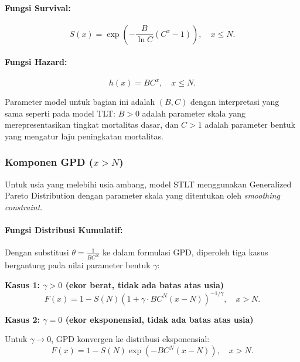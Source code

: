 \paragraph{Fungsi Survival:}
\begin{equation}
S(x) = \exp\left(-\frac{B}{\ln C}(C^x - 1)\right), \quad x \leq N.
\label{eq:stlt_gompertz_survival}
\end{equation}

\paragraph{Fungsi Hazard:}
\begin{equation}
h(x) = BC^x, \quad x \leq N.
\label{eq:stlt_gompertz_hazard}
\end{equation}

Parameter model untuk bagian ini adalah $(B, C)$ dengan interpretasi yang sama seperti pada model TLT: $B > 0$ adalah parameter skala yang merepresentasikan tingkat mortalitas dasar, dan $C > 1$ adalah parameter bentuk yang mengatur laju peningkatan mortalitas.

\subsubsection{Komponen GPD ($x > N$)}

Untuk usia yang melebihi usia ambang, model STLT menggunakan Generalized Pareto Distribution dengan parameter skala yang ditentukan oleh \textit{smoothing constraint}.

\paragraph{Fungsi Distribusi Kumulatif:}

Dengan substitusi $\theta = \frac{1}{BC^N}$ ke dalam formulasi GPD, diperoleh tiga kasus bergantung pada nilai parameter bentuk $\gamma$:

\textbf{Kasus 1: $\gamma > 0$ (ekor berat, tidak ada batas atas usia)}
\begin{equation}
F(x) = 1 - S(N) \left(1 + \gamma \cdot BC^N(x-N)\right)^{-1/\gamma}, \quad x > N.
\label{eq:stlt_gpd_cdf_positive}
\end{equation}

\textbf{Kasus 2: $\gamma = 0$ (ekor eksponensial, tidak ada batas atas usia)}

Untuk $\gamma \to 0$, GPD konvergen ke distribusi eksponensial:
\begin{equation}
F(x) = 1 - S(N) \exp\left(-BC^N(x-N)\right), \quad x > N.
\label{eq:stlt_gpd_cdf_zero}
\end{equation}

